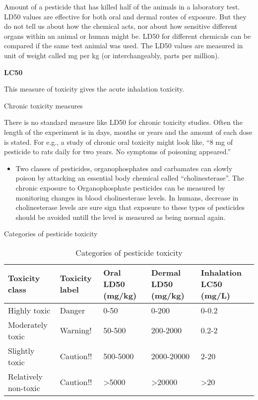 \documentclass[]{book}
\providecommand{\tightlist}{%
  \setlength{\itemsep}{0pt}\setlength{\parskip}{0pt}}
\begin{document}
Amount of a pesticide that has killed half of the animals in a laboratory test. LD50 values are effective for both oral and dermal routes of exposure. But they do not tell us about how the chemical acts, nor about how sensitive different organs within an animal or human might be. LD50 for different chemicals can be compared if the same test animial was used. The LD50 values are measured in unit of weight called mg per kg (or interchangeably, parts per million).

\textbf{LC50}

This measure of toxicity gives the acute inhalation toxicity.

Chronic toxicity measures

There is no standard measure like LD50 for chronic toxicity studies. Often the length of the experiment is in days, months or years and the amount of each dose is stated. For e.g., a study of chronic oral toxicity might look like, ``8 mg of pesticide to rats daily for two years. No symptoms of poisoning appeared.''

\begin{itemize}
\tightlist
\item
  Two classes of pesticides, organophosphates and carbamates can slowly poison by attacking an essential body chemical called ``cholinesterase''. The chronic exposure to Organophosphate pesticides can be measured by monitoring changes in blood cholinesterase levels. In humans, decrease in cholinesterase levels are sure sign that exposure to these types of pesticides should be avoided untill the level is measured as being normal again.
\end{itemize}

Categories of pesticide toxicity

\begin{table}

\caption{\label{tab:pesticide-hazard-category}Categories of pesticide toxicity}
\centering
\begin{tabular}[t]{lllll}
\toprule
Toxicity class & Toxicity label & Oral LD50 (mg/kg) & Dermal LD50 (mg/kg) & Inhalation LC50 (mg/L)\\
\midrule
Highly toxic & Danger & 0-50 & 0-200 & 0-0.2\\
Moderately toxic & Warning! & 50-500 & 200-2000 & 0.2-2\\
Slightly toxic & Caution!! & 500-5000 & 2000-20000 & 2-20\\
Relatively non-toxic & Caution!! & >5000 & >20000 & >20\\
\bottomrule
\end{tabular}
\end{table}
\end{document}
